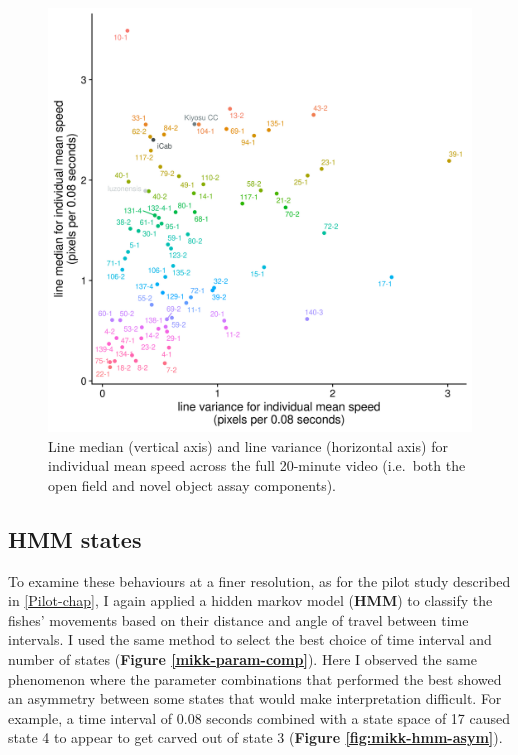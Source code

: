 \documentclass[
]{article}
\begin{document}
\begin{figure}
\includegraphics[width=1\linewidth]{figs/mikk_behaviour/line_mean_speed_variance_0.05_all} \caption{Line median (vertical axis) and line variance (horizontal axis) for individual mean speed across the full 20-minute video (i.e.~both the open field and novel object assay components).}\label{fig:mikk-mean-speed-variance}
\end{figure}

\hypertarget{hmm-states}{%
\subsection{HMM states}\label{hmm-states}}

To examine these behaviours at a finer resolution, as for the pilot study described in \ref{Pilot-chap}, I again applied a hidden markov model (\textbf{HMM}) to classify the fishes' movements based on their distance and angle of travel between time intervals. I used the same method to select the best choice of time interval and number of states (\textbf{Figure \ref{mikk-param-comp}}). Here I observed the same phenomenon where the parameter combinations that performed the best showed an asymmetry between some states that would make interpretation difficult. For example, a time interval of 0.08 seconds combined with a state space of 17 caused state 4 to appear to get carved out of state 3 (\textbf{Figure \ref{fig:mikk-hmm-asym}}).
\end{document}
